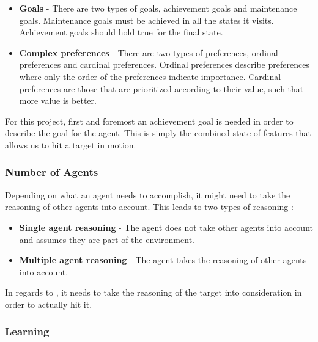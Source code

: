 \begin{itemize}
  \item \textbf{Goals} - There are two types of goals, achievement goals and
  maintenance goals. Maintenance goals must be achieved in all the states it
  visits. Achievement goals should hold true for the final state. 
  \item \textbf{Complex preferences} - There are two types of preferences,
  ordinal preferences and cardinal preferences. Ordinal preferences describe
  preferences where only the order of the preferences indicate importance.
  Cardinal preferences are those that are prioritized according to their value,
  such that more value is better.
\end{itemize}

For this project, first and foremost an achievement goal is needed in order to
describe the goal for the agent. This is simply the combined state of features
that allows us to hit a target in motion. 

\subsubsection{Number of Agents}
Depending on what an agent needs to accomplish, it might need to take the
reasoning of other agents into account. This leads to two types of reasoning
\citep[Ch. 1.5.6]{MIBook}:
\begin{itemize}
  \item \textbf{Single agent reasoning} - The agent does not take other
  agents into account and assumes they are part of the environment.
  \item \textbf{Multiple agent reasoning} - The agent takes the reasoning of
  other agents into account.
\end{itemize}

In regards to \namep, it needs to take the reasoning of the target into
consideration in order to actually hit it.


\subsubsection{Learning}

